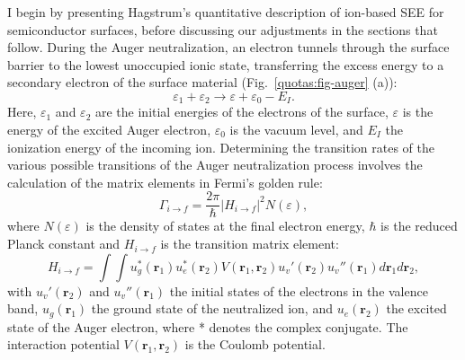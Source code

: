 \begin{refsection}
I begin by presenting Hagstrum's quantitative description of ion-based \gls{SEE} 
for semiconductor surfaces, before discussing our adjustments in the sections 
that follow. During the Auger neutralization, an electron tunnels through the 
surface barrier to the lowest unoccupied ionic state, transferring the excess 
energy to a secondary electron of the surface material 
(Fig.~\ref{quotas:fig-auger} (a)): 
\begin{equation} \label{quotas:eq-energyconv} 
\varepsilon_1 + \varepsilon_2 \rightarrow \varepsilon + \varepsilon_0 - E_I. 
\end{equation} 
Here, $\varepsilon_1$ and $\varepsilon_2$ are the initial energies of the 
electrons of the surface, $\varepsilon$ is the energy of the excited Auger 
electron, $\varepsilon_0$ is the vacuum level, and $E_I$ the ionization energy 
of the incoming ion. Determining the transition rates of the various possible 
transitions of the Auger neutralization process involves the calculation of the 
matrix elements in Fermi's golden rule: 
\begin{equation} \label{quotas:eq-fermi} 
    \Gamma_{i\rightarrow f} = \frac{2\pi}{\hbar} \left| H_{i\rightarrow 
f}\right|^2 N(\varepsilon) , 
\end{equation} 
where $N(\varepsilon)$ is the density of states at the final electron energy, 
$\hbar$ is the reduced Planck constant and $H_{i\rightarrow f}$ is the 
transition matrix element: 
\begin{equation} 
    H_{i\rightarrow f} = \int \int u^*_g(\mathbf{r}_1) u^*_e(\mathbf{r}_2) 
V(\mathbf{r}_1, \mathbf{r}_2) u_v'(\mathbf{r}_2) u_v''(\mathbf{r}_1) 
d\mathbf{r}_1 d\mathbf{r}_2, 
\end{equation} 
with $ u_v'(\mathbf{r}_2)$ and $ u_v''(\mathbf{r}_1)$ the initial states of 
the electrons in the valence band, $u_g(\mathbf{r}_1)$ the ground state of the 
neutralized ion, and $u_e(\mathbf{r}_2)$ the excited state of the Auger 
electron, where * denotes the complex conjugate. The interaction potential 
$V(\mathbf{r}_1, \mathbf{r}_2)$ is the Coulomb potential. 
 

\end{refsection}
